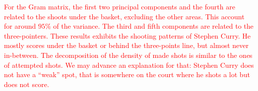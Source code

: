 \textcolor{red}{For the Gram matrix, the first two principal components and the fourth are related to the shoots under the basket, excluding the other areas. This account for around $95\%$ of the variance. The third and fifth components are related to the three-pointers. These results exhibits the shooting patterns of Stephen Curry. He mostly scores under the basket or behind the three-points line, but almost never in-between. The decomposition of the density of made shots is similar to the ones of attempted shots. We may advance an explanation for that: Stephen Curry does not have a ``weak'' spot, that is somewhere on the court where he shots a lot but does not score.}
